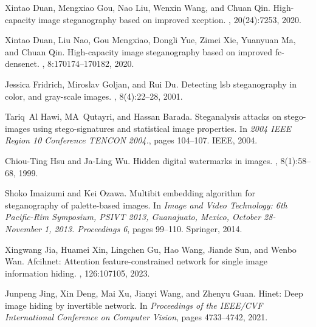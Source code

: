 \documentclass{article}
\begin{document}
\begin{thebibliography}{}
	Xintao Duan, Mengxiao Gou, Nao Liu, Wenxin Wang, and Chuan Qin.
	\newblock High-capacity image steganography based on improved xception.
	, 20(24):7253, 2020.
	
	Xintao Duan, Liu Nao, Gou Mengxiao, Dongli Yue, Zimei Xie, Yuanyuan Ma, and
	Chuan Qin.
	\newblock High-capacity image steganography based on improved fc-densenet.
	, 8:170174--170182, 2020.
	
	Jessica Fridrich, Miroslav Goljan, and Rui Du.
	\newblock Detecting lsb steganography in color, and gray-scale images.
	, 8(4):22--28, 2001.
	
	Tariq~Al Hawi, MA~Qutayri, and Hassan Barada.
	\newblock Steganalysis attacks on stego-images using stego-signatures and
	statistical image properties.
	\newblock In {\em 2004 IEEE Region 10 Conference TENCON 2004.}, pages 104--107.
	IEEE, 2004.
	
	Chiou-Ting Hsu and Ja-Ling Wu.
	\newblock Hidden digital watermarks in images.
	, 8(1):58--68, 1999.
	
	Shoko Imaizumi and Kei Ozawa.
	\newblock Multibit embedding algorithm for steganography of palette-based
	images.
	\newblock In {\em Image and Video Technology: 6th Pacific-Rim Symposium, PSIVT
		2013, Guanajuato, Mexico, October 28-November 1, 2013. Proceedings 6}, pages
	99--110. Springer, 2014.
	
	Xingwang Jia, Huamei Xin, Lingchen Gu, Hao Wang, Jiande Sun, and Wenbo Wan.
	\newblock Afcihnet: Attention feature-constrained network for single image
	information hiding.
	,
	126:107105, 2023.
	
	Junpeng Jing, Xin Deng, Mai Xu, Jianyi Wang, and Zhenyu Guan.
	\newblock Hinet: Deep image hiding by invertible network.
	\newblock In {\em Proceedings of the IEEE/CVF International Conference on
		Computer Vision}, pages 4733--4742, 2021.
	

\end{thebibliography}
\end{document}
